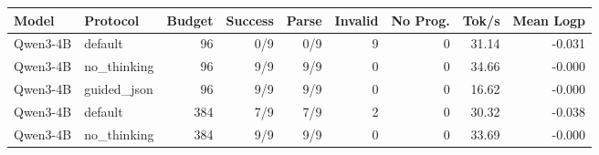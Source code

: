 \begin{tabular}{llrrrrrrr}
\toprule
Model & Protocol & Budget & Success & Parse & Invalid & No Prog. & Tok/s & Mean Logp \\
\midrule
Qwen3-4B & default & 96 & 0/9 & 0/9 & 9 & 0 & 31.14 & -0.031 \\
Qwen3-4B & no\_thinking & 96 & 9/9 & 9/9 & 0 & 0 & 34.66 & -0.000 \\
Qwen3-4B & guided\_json & 96 & 9/9 & 9/9 & 0 & 0 & 16.62 & -0.000 \\
Qwen3-4B & default & 384 & 7/9 & 7/9 & 2 & 0 & 30.32 & -0.038 \\
Qwen3-4B & no\_thinking & 384 & 9/9 & 9/9 & 0 & 0 & 33.69 & -0.000 \\
\bottomrule
\end{tabular}
